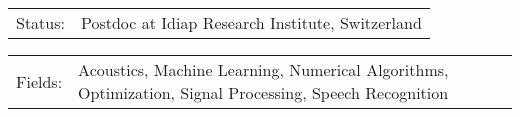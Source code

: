 \documentclass[10pt,A4]{article}
\newcommand{\tzlarrow}{(0,0) -- (0.2,0) -- (0.3,0.2) -- (0.2,0.4) -- (0,0.4) -- (0.1,0.2) -- cycle;}
\newcommand{\larrow}[1]
{\begin{tikzpicture}[scale=0.58]
	 \filldraw[fill=#1!100,draw=#1!100!black]  \tzlarrow
 \end{tikzpicture}
}
\newcommand{\metasection}[2]
{
\begin{tabular*}{1\textwidth}{p{2.4cm} p{11cm}}
\larrow{bgcol}	\normalsize{\textcolor{sectcol}{#1}}&#2\\[12pt]
\end{tabular*}
}
\begin{document}
\pagestyle{fancy}


\vspace{-20.55pt}


\hspace{-0.25\linewidth}\colorbox{bgcol}{
}






\vspace{10pt}

\metasection{Status:}{Postdoc at Idiap Research Institute, Switzerland}
\metasection{Fields:}{Acoustics, Machine Learning, Numerical Algorithms, Optimization, Signal Processing, Speech Recognition}

\vspace{6pt}

\end{document}
